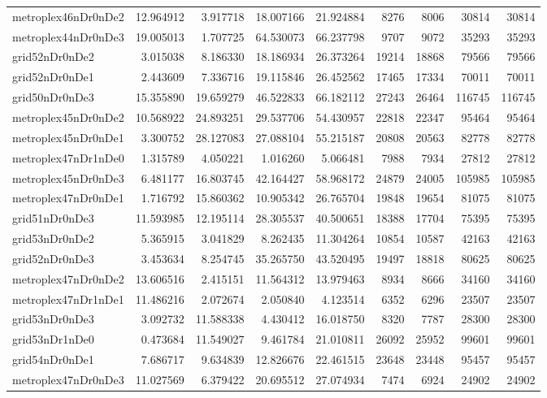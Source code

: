 \begin{longtable}{|l|r|r|r|r|r|r|r|r|}
metroplex46nDr0nDe2 & 12.964912 & 3.917718 & 18.007166 & 21.924884 & 8276 & 8006 & 30814 & 30814 \\
metroplex44nDr0nDe3 & 19.005013 & 1.707725 & 64.530073 & 66.237798 & 9707 & 9072 & 35293 & 35293 \\
grid52nDr0nDe2 & 3.015038 & 8.186330 & 18.186934 & 26.373264 & 19214 & 18868 & 79566 & 79566 \\
grid52nDr0nDe1 & 2.443609 & 7.336716 & 19.115846 & 26.452562 & 17465 & 17334 & 70011 & 70011 \\
grid50nDr0nDe3 & 15.355890 & 19.659279 & 46.522833 & 66.182112 & 27243 & 26464 & 116745 & 116745 \\
metroplex45nDr0nDe2 & 10.568922 & 24.893251 & 29.537706 & 54.430957 & 22818 & 22347 & 95464 & 95464 \\
metroplex45nDr0nDe1 & 3.300752 & 28.127083 & 27.088104 & 55.215187 & 20808 & 20563 & 82778 & 82778 \\
metroplex47nDr1nDe0 & 1.315789 & 4.050221 & 1.016260 & 5.066481 & 7988 & 7934 & 27812 & 27812 \\
metroplex45nDr0nDe3 & 6.481177 & 16.803745 & 42.164427 & 58.968172 & 24879 & 24005 & 105985 & 105985 \\
metroplex47nDr0nDe1 & 1.716792 & 15.860362 & 10.905342 & 26.765704 & 19848 & 19654 & 81075 & 81075 \\
grid51nDr0nDe3 & 11.593985 & 12.195114 & 28.305537 & 40.500651 & 18388 & 17704 & 75395 & 75395 \\
grid53nDr0nDe2 & 5.365915 & 3.041829 & 8.262435 & 11.304264 & 10854 & 10587 & 42163 & 42163 \\
grid52nDr0nDe3 & 3.453634 & 8.254745 & 35.265750 & 43.520495 & 19497 & 18818 & 80625 & 80625 \\
metroplex47nDr0nDe2 & 13.606516 & 2.415151 & 11.564312 & 13.979463 & 8934 & 8666 & 34160 & 34160 \\
metroplex47nDr1nDe1 & 11.486216 & 2.072674 & 2.050840 & 4.123514 & 6352 & 6296 & 23507 & 23507 \\
grid53nDr0nDe3 & 3.092732 & 11.588338 & 4.430412 & 16.018750 & 8320 & 7787 & 28300 & 28300 \\
grid53nDr1nDe0 & 0.473684 & 11.549027 & 9.461784 & 21.010811 & 26092 & 25952 & 99601 & 99601 \\
grid54nDr0nDe1 & 7.686717 & 9.634839 & 12.826676 & 22.461515 & 23648 & 23448 & 95457 & 95457 \\
metroplex47nDr0nDe3 & 11.027569 & 6.379422 & 20.695512 & 27.074934 & 7474 & 6924 & 24902 & 24902 \\

\end{longtable}
